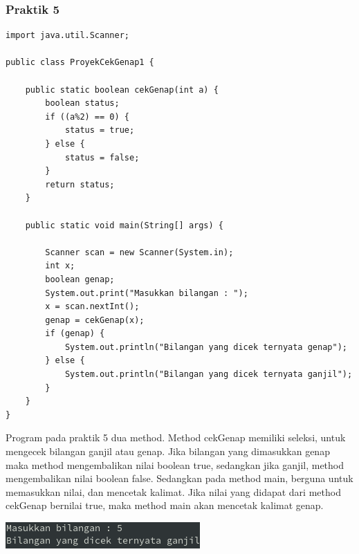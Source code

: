 \documentclass[a4paper,12pt]{article}
\begin{document}
\subsubsection{Praktik 5}
\begin{lstlisting}
import java.util.Scanner;

public class ProyekCekGenap1 {

    public static boolean cekGenap(int a) {
        boolean status;
        if ((a%2) == 0) {
            status = true;
        } else {
            status = false;
        }
        return status;
    }

    public static void main(String[] args) {

        Scanner scan = new Scanner(System.in);
        int x;
        boolean genap;
        System.out.print("Masukkan bilangan : ");
        x = scan.nextInt();
        genap = cekGenap(x);
        if (genap) {
            System.out.println("Bilangan yang dicek ternyata genap");
        } else {
            System.out.println("Bilangan yang dicek ternyata ganjil");
        }
    }
}
\end{lstlisting}

Program pada praktik 5 dua method. Method cekGenap memiliki seleksi, untuk mengecek bilangan ganjil atau genap. Jika
bilangan yang dimasukkan genap maka method mengembalikan nilai boolean true, sedangkan jika ganjil, method mengembalikan
nilai boolean false. Sedangkan pada method main, berguna untuk memasukkan nilai, dan mencetak kalimat. Jika nilai yang
didapat dari method cekGenap bernilai true, maka method main akan mencetak kalimat genap.

\begin{center}
    \includegraphics[]{5.png} 
\end{center}
\end{document}
